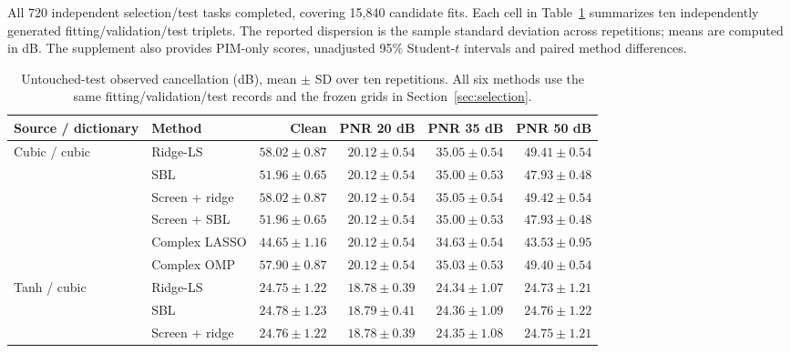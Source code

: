 All 720 independent selection/test tasks completed, covering 15,840 candidate fits. Each cell in Table~\ref{tab:benchmark} summarizes ten independently generated fitting/validation/test triplets. The reported dispersion is the sample standard deviation across repetitions; means are computed in dB. The supplement also provides PIM-only scores, unadjusted 95\% Student-$t$ intervals and paired method differences.

\begin{table}[!t]

\caption{Untouched-test observed cancellation (dB), mean $\pm$ SD over ten repetitions. All six methods use the same fitting/validation/test records and the frozen grids in Section~\ref{sec:selection}.}

\label{tab:benchmark}\centering\small\setlength{\tabcolsep}{3pt}

\begin{tabular}{llrrrr}\toprule

Source / dictionary & Method & Clean & PNR 20 dB & PNR 35 dB & PNR 50 dB\\\midrule

Cubic / cubic & Ridge-LS & $58.02\pm0.87$ & $20.12\pm0.54$ & $35.05\pm0.54$ & $49.41\pm0.54$\\

 & SBL & $51.96\pm0.65$ & $20.12\pm0.54$ & $35.00\pm0.53$ & $47.93\pm0.48$\\

 & Screen + ridge & $58.02\pm0.87$ & $20.12\pm0.54$ & $35.05\pm0.54$ & $49.42\pm0.54$\\

 & Screen + SBL & $51.96\pm0.65$ & $20.12\pm0.54$ & $35.00\pm0.53$ & $47.93\pm0.48$\\

 & Complex LASSO & $44.65\pm1.16$ & $20.12\pm0.54$ & $34.63\pm0.54$ & $43.53\pm0.95$\\

 & Complex OMP & $57.90\pm0.87$ & $20.12\pm0.54$ & $35.03\pm0.53$ & $49.40\pm0.54$\\

\midrule

Tanh / cubic & Ridge-LS & $24.75\pm1.22$ & $18.78\pm0.39$ & $24.34\pm1.07$ & $24.73\pm1.21$\\

 & SBL & $24.78\pm1.23$ & $18.79\pm0.41$ & $24.36\pm1.09$ & $24.76\pm1.22$\\

 & Screen + ridge & $24.76\pm1.22$ & $18.78\pm0.39$ & $24.35\pm1.08$ & $24.75\pm1.21$\\


\end{tabular}
\end{table}
